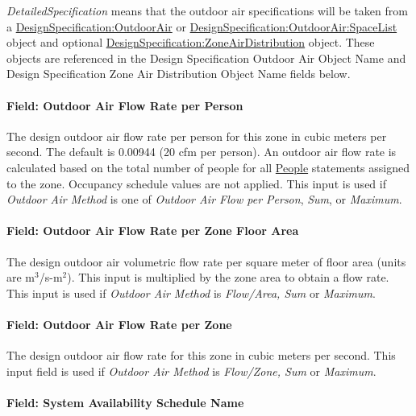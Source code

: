 \emph{DetailedSpecification} means that the outdoor air specifications will be taken from a \hyperref[designspecificationoutdoorair]{DesignSpecification:OutdoorAir} or \hyperref[designspecificationoutdoorairspacelist]{DesignSpecification:OutdoorAir:SpaceList} object and optional \hyperref[designspecificationzoneairdistribution]{DesignSpecification:ZoneAirDistribution} object. These objects are referenced in the Design Specification Outdoor Air Object Name and Design Specification Zone Air Distribution Object Name fields below.

\paragraph{Field: Outdoor Air Flow Rate per Person}\label{field-outdoor-air-flow-rate-per-person-3}

The design outdoor air flow rate per person for this zone in cubic meters per second. The default is 0.00944 (20 cfm per person). An outdoor air flow rate is calculated based on the total number of people for all \hyperref[people]{People} statements assigned to the zone. Occupancy schedule values are not applied. This input is used if \emph{Outdoor Air Method} is one of \emph{Outdoor Air Flow per Person}, \emph{Sum}, or \emph{Maximum}.

\paragraph{Field: Outdoor Air Flow Rate per Zone Floor Area}\label{field-outdoor-air-flow-rate-per-zone-floor-area-3}

The design outdoor air volumetric flow rate per square meter of floor area (units are m\(^{3}\)/s-m\(^{2}\)). This input is multiplied by the zone area to obtain a flow rate. This input is used if \emph{Outdoor Air Method} is \emph{Flow/Area, Sum} or \emph{Maximum}.

\paragraph{Field: Outdoor Air Flow Rate per Zone}\label{field-outdoor-air-flow-rate-per-zone-3}

The design outdoor air flow rate for this zone in cubic meters per second. This input field is used if \emph{Outdoor Air Method} is \emph{Flow/Zone, Sum} or \emph{Maximum}.

\paragraph{Field: System Availability Schedule Name}\label{field-system-availability-schedule-name-2}

